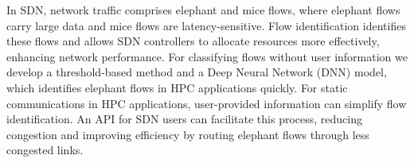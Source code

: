\begin{comment}
\subsection{Classifying flows with user information}
Static communications are communications whose
information can be determined at compile time. In MPI, major portion of
communication is static, that is, it can be determined during compile time. 
For static communications in HPC applications like the ones in Stencil4d 
shown in Figure \ref{Stencil4d Code snippet}, 
the HPC application developer (or compiler and communication library) 
has the knowledge whether a communication is an elephant flow or not. 
If the SDN allows HPC applications (SDN users) to give hints about 
their communications, the flow identification task performed by the 
SDN can be greatly simplified. To facilitate this, we propose to have 
an API for SDN users to provide such information which can help in 
classifying the elephant and the mice flows.



HPC applications deal with massive computations and data transfers, 
needing fast, responsive network connections. When SDN-controllers
pinpoint the types of network flows (such as elephant flows and mice flows) 
these applications generate, it helps to route the bandwidth heavy elephant flows
 through links which are not shared by too many elephant flows, so that each
 of them can get sufficient bandwidth. This reduces the overall congestion 
in the network and the applications run more efficiently.


\begin{figure}[hbtp]
\caption{Stencil4d Code snippet}
\label{code.stencil}
\begin{lstlisting}[breaklines]
for (int i = 0; i < MAX_ITER; i++) {
        MPI_Isend(sendn, 100000000, MPI_CHAR, north, 9, MPI_COMM_WORLD, &reqs[0]
);
        ...
        MPI_Irecv(recvn, 100000000, MPI_CHAR, north, 9, MPI_COMM_WORLD, &reqs[8]
);
        ...
        MPI_Waitall(16, req status);
}
\end{lstlisting}
\end{figure}

\end{comment}

In SDN, network traffic comprises elephant and mice flows, where elephant flows carry large data and mice flows are latency-sensitive. Flow identification identifies these flows and allows SDN controllers to allocate resources more effectively, enhancing network performance. For classifying flows without user information we develop a threshold-based method and a Deep Neural Network (DNN) model, which identifies elephant flows in HPC applications quickly. For static communications in HPC applications, user-provided information can simplify flow identification. An API for SDN users can facilitate this process, reducing congestion and improving efficiency by routing elephant flows through less congested links.

